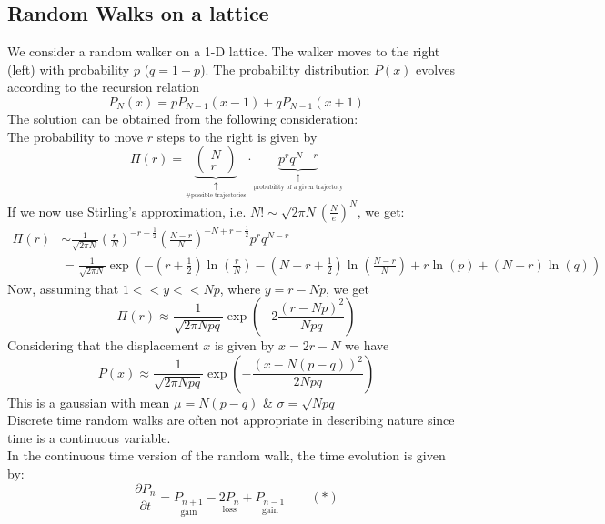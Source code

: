 \subsection{Random Walks on a lattice}
We consider a random walker on a 1-D lattice. The walker moves to the right (left) with probability $p$ ($q=1-p$). The probability distribution $P(x)$ evolves according to the recursion relation
\begin{equation*}
	P_N(x)=pP_{N-1}(x-1)+qP_{N-1}(x+1)
\end{equation*}
The solution can be obtained from the following consideration:\\
The probability to move $r$ steps to the right is given by
\begin{equation*}
	\Pi(r)=\underset{\underset{\text{\# possible trajectories}}{\uparrow}}{\underbrace{\begin{pmatrix} N \\ r \end{pmatrix}}}\cdot\underset{\underset{\text{probability of a given trajectory}}{\uparrow}}{\underbrace{p^rq^{N-r}}}
\end{equation*}
If we now use Stirling's approximation, i.e. $N!\sim \sqrt{2\pi N}\left(\frac{N}{e}\right)^N$, we get:
\begin{align*}
	\Pi(r)&\sim\frac{1}{\sqrt{2\pi N}}\left(\frac{r}{N}\right)^{-r-\frac{1}{2}}\left(\frac{N-r}{N}\right)^{-N+r-\frac{1}{2}}p^rq^{N-r}\\
	&=\frac{1}{\sqrt{2\pi N}}\exp\left(-\left(r+\frac{1}{2}\right)\ln\left(\frac{r}{N}\right)-\left(N-r+\frac{1}{2}\right)\ln\left(\frac{N-r}{N}\right)+r\ln(p)+(N-r)\ln(q)\right)
\end{align*}
Now, assuming that $1<<y<<Np$, where $y=r-Np$, we get
\begin{equation*}
	\Pi(r)\approx\frac{1}{\sqrt{2\pi Npq}}\exp\left(-2\frac{(r-Np)^2}{Npq}\right)
\end{equation*}
Considering that the displacement $x$ is given by $x=2r-N$ we have
\begin{equation*}
	P(x)\approx\frac{1}{\sqrt{2\pi Npq}}\exp\left(-\frac{(x-N(p-q))^2}{2Npq}\right)
\end{equation*}
This is a gaussian with mean $\mu=N(p-q)$ \& $\sigma=\sqrt{Npq}$\\
Discrete time random walks are often not appropriate in describing nature since time is a continuous variable.\\
In the continuous time version of the random walk, the time evolution is given by:
\begin{equation*}
	\frac{\partial P_n}{\partial t}=\underset{\text{gain}}{P_{n+1}}-\underset{\text{loss}}{2P_n}+\underset{\text{gain}}{P_{n-1}}\qquad (\ast)
\end{equation*}
